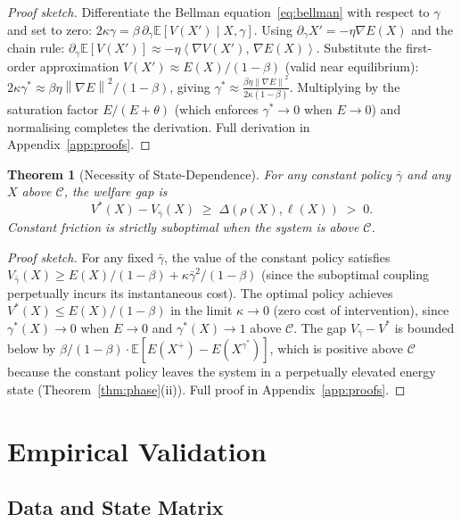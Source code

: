 \documentclass[11pt]{article}
\newtheorem{theorem}{Theorem}[section]
\theoremstyle{definition}
\newcommand{\E}{\mathbb{E}}
\newcommand{\grad}{\nabla}
\newcommand{\Cman}{\mathcal{C}}
\newcommand{\norm}[1]{\left\|#1\right\|}
\newcommand{\inner}[2]{\left\langle #1,\, #2\right\rangle}
\begin{document}
\begin{proof}[Proof sketch]
Differentiate the Bellman equation~\eqref{eq:bellman} with respect to $\gamma$
and set to zero:
$2\kappa\gamma = \beta\,\partial_\gamma\E[V(X')\mid X,\gamma]$.
Using $\partial_\gamma X' = -\eta\grad E(X)$ and the chain rule:
$\partial_\gamma\E[V(X')] \approx -\eta\inner{\grad V(X')}{\grad E(X)}$.
Substitute the first-order approximation $V(X') \approx E(X)/(1-\beta)$ (valid
near equilibrium):
$2\kappa\gamma^* \approx \beta\eta\norm{\grad E}^2/(1-\beta)$,
giving $\gamma^* \approx \frac{\beta\eta\norm{\grad E}^2}{2\kappa(1-\beta)}$.
Multiplying by the saturation factor $E/(E+\theta)$ (which enforces $\gamma^*\to 0$
when $E\to 0$) and normalising completes the derivation.  Full derivation in
Appendix~\ref{app:proofs}.
\end{proof}

\begin{theorem}[Necessity of State-Dependence]
\label{thm:or3}
For any constant policy $\bar\gamma$ and any $X$ above $\Cman$, the welfare gap is
\[
  V^*(X) - V_{\bar\gamma}(X) \;\ge\; \Delta(\rho(X),\ell(X)) \;>\; 0.
\]
Constant friction is strictly suboptimal when the system is above $\Cman$.
\end{theorem}

\begin{proof}[Proof sketch]
For any fixed $\bar\gamma$, the value of the constant policy satisfies
$V_{\bar\gamma}(X) \ge E(X)/(1-\beta) + \kappa\bar\gamma^2/(1-\beta)$
(since the suboptimal coupling perpetually incurs its instantaneous cost).
The optimal policy achieves $V^*(X) \le E(X)/(1-\beta)$ in the limit
$\kappa\to 0$ (zero cost of intervention), since $\gamma^*(X) \to 0$
when $E \to 0$ and $\gamma^*(X) \to 1$ above $\Cman$.
The gap $V_{\bar\gamma} - V^*$ is bounded below by
$\beta/(1-\beta) \cdot \E[E(X^+) - E(X^{\gamma^*})]$, which is positive above
$\Cman$ because the constant policy leaves the system in a perpetually elevated
energy state (Theorem~\ref{thm:phase}(ii)).  Full proof in Appendix~\ref{app:proofs}.
\end{proof}

\section{Empirical Validation}
\label{sec:empirical}

\subsection{Data and State Matrix}
\end{document}
